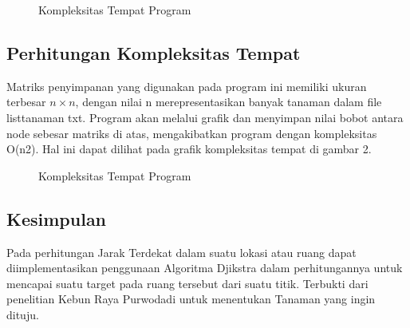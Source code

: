 \documentclass[conference]{IEEEtran}
\begin{document}
    \begin{figure}[htbp]
        \centering
        \scalebox{0.4}{}
        \caption{Kompleksitas Tempat Program}
    \end{figure}

    \subsection{Perhitungan Kompleksitas Tempat}
    Matriks penyimpanan yang digunakan pada program ini memiliki ukuran terbesar $n \times n$, dengan nilai n merepresentasikan banyak tanaman dalam file listtanaman txt. Program akan melalui grafik dan menyimpan nilai bobot antara node sebesar matriks di atas, mengakibatkan program dengan kompleksitas O(n2). Hal ini dapat dilihat pada grafik kompleksitas tempat di gambar 2.

    \begin{figure}[htbp]
        \centering
        \scalebox{0.4}{}
        \caption{Kompleksitas Tempat Program}
    \end{figure}

    \subsection{Kesimpulan}
    Pada perhitungan Jarak Terdekat dalam suatu lokasi atau ruang dapat diimplementasikan penggunaan Algoritma Djikstra dalam perhitungannya untuk mencapai suatu target pada ruang tersebut dari suatu titik. Terbukti dari penelitian Kebun Raya Purwodadi untuk menentukan Tanaman yang ingin dituju.


\end{document}

